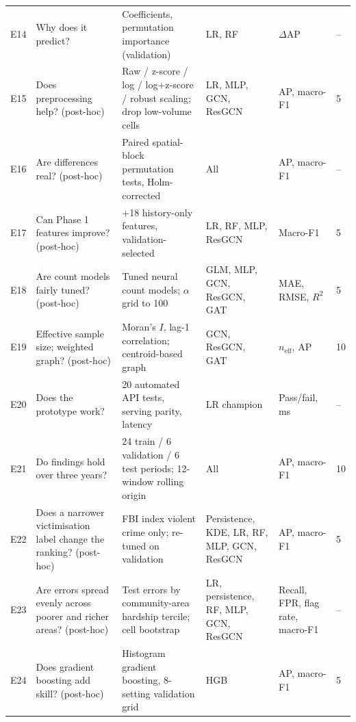 \documentclass[11pt,a4paper]{report}
\begin{document}
\begin{table}[H]
\begin{tabularx}{\textwidth}{@{}l L{3.4cm} Y L{2.3cm} L{1.6cm} l@{}}
E14 & Why does it predict? & Coefficients, permutation importance (validation) & LR, RF & $\Delta$AP & --\\
E15 & Does preprocessing help? (post-hoc) & Raw / z-score / log / log+z-score / robust scaling; drop low-volume cells & LR, MLP, GCN, ResGCN & AP, macro-F1 & 5\\
E16 & Are differences real? (post-hoc) & Paired spatial-block permutation tests, Holm-corrected & All & AP, macro-F1 & --\\
E17 & Can Phase 1 features improve? (post-hoc) & +18 history-only features, validation-selected & LR, RF, MLP, ResGCN & Macro-F1 & 5\\
E18 & Are count models fairly tuned? (post-hoc) & Tuned neural count models; $\alpha$ grid to 100 & GLM, MLP, GCN, ResGCN, GAT & MAE, RMSE, $R^2$ & 5\\
E19 & Effective sample size; weighted graph? (post-hoc) & Moran's $I$, lag-1 correlation; centroid-based graph & GCN, ResGCN, GAT & $n_\mathrm{eff}$, AP & 10\\
E20 & Does the prototype work? & 20 automated API tests, serving parity, latency & LR champion & Pass/fail, ms & --\\
E21 & Do findings hold over three years? & 24 train / 6 validation / 6 test periods; 12-window rolling origin & All & AP, macro-F1 & 10\\
E22 & Does a narrower victimisation label change the ranking? (post-hoc) & FBI index violent crime only; re-tuned on validation & Persistence, KDE, LR, RF, MLP, GCN, ResGCN & AP, macro-F1 & 5\\
E23 & Are errors spread evenly across poorer and richer areas? (post-hoc) & Test errors by community-area hardship tercile; cell bootstrap & LR, persistence, RF, MLP, GCN, ResGCN & Recall, FPR, flag rate, macro-F1 & --\\
E24 & Does gradient boosting add skill? (post-hoc) & Histogram gradient boosting, 8-setting validation grid & HGB & AP, macro-F1 & 5\\
\bottomrule
\end{tabularx}
\end{table}
\end{document}

